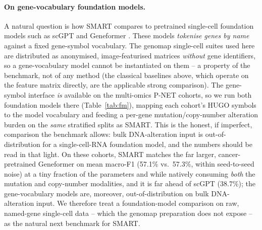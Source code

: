 \documentclass[letterpaper]{article}
\begin{document}
\paragraph{On gene-vocabulary foundation models.}
A natural question is how SMART compares to pretrained single-cell foundation models such
as scGPT \cite{cui2024scgpt} and Geneformer \cite{theodoris2023transfer}. These models
\emph{tokenise genes by name} against a fixed gene-symbol vocabulary. The genomap
single-cell suites used here are distributed as anonymised, image-featurised matrices
\emph{without} gene identifiers, so a gene-vocabulary model cannot be instantiated on
them -- a property of the benchmark, not of any method (the classical baselines above,
which operate on the feature matrix directly, are the applicable strong comparison). The
gene-symbol interface \emph{is} available on the multi-omics P-NET cohorts, so we run both
foundation models there (Table~\ref{tab:fm}), mapping each cohort's HUGO symbols to the
model vocabulary and feeding a per-gene mutation/copy-number alteration burden on the
\emph{same} stratified splits as SMART. This is the honest, if imperfect, comparison the
benchmark allows: bulk DNA-alteration input is out-of-distribution for a single-cell-RNA
foundation model, and the numbers should be read in that light. On these cohorts,
SMART matches the far larger, cancer-pretrained Geneformer on mean macro-F1 (57.1\% vs.\ 57.3\%, within seed-to-seed noise) at a tiny fraction of the parameters and while natively consuming \emph{both} the mutation and copy-number modalities, and it is far ahead of scGPT (38.7\%); the gene-vocabulary models are, moreover, out-of-distribution on bulk DNA-alteration input. We therefore treat a foundation-model comparison on raw, named-gene
single-cell data -- which the genomap preparation does not expose -- as the natural next
benchmark for SMART.
\end{document}
